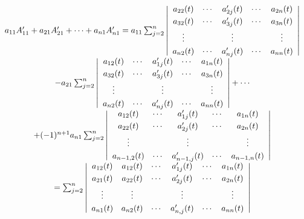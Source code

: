 \begin{frame}
  \begin{footnotesize}
    $$
    \begin{array}{c}
       a_{11}A_{11}^\prime +  a_{21}A_{21}^\prime + \cdots + a_{n1}A_{n1}^\prime
       =a_{11} \sum_{j=2}^n \left|
      \begin{array}{ccccc}
        a_{22}(t)&\cdots&a_{2j}^\prime(t)&\cdots&a_{2n}(t)\\[0.1cm]
        a_{32}(t)&\cdots&a_{3j}^\prime(t)&\cdots&a_{3n}(t)\\[0.1cm]
        \vdots&&\vdots&&\vdots\\[0.1cm]
        a_{n2}(t)&\cdots&a_{nj}^\prime(t)&\cdots&a_{nn}(t)
      \end{array}
      \right| \\[0.3in]
      -  a_{21}\sum_{j=2}^n \left|
      \begin{array}{ccccc}
        a_{12}(t)&\cdots&a_{1j}^\prime(t)&\cdots&a_{1n}(t)\\[0.1cm]
        a_{32}(t)&\cdots&a_{3j}^\prime(t)&\cdots&a_{3n}(t)\\[0.1cm]
        \vdots&&\vdots&&\vdots\\[0.1cm]
        a_{n2}(t)&\cdots&a_{nj}^\prime(t)&\cdots&a_{nn}(t)
      \end{array}
      \right| + \cdots \\[0.3in]
      + (-1)^{n+1}a_{n1}\sum_{j=2}^n \left|
      \begin{array}{ccccc}
        a_{12}(t)&\cdots&a_{1j}^\prime(t)&\cdots&a_{1n}(t)\\[0.1cm]
        a_{22}(t)&\cdots&a_{2j}^\prime(t)&\cdots&a_{2n}(t)\\[0.1cm]
        \vdots&&\vdots&&\vdots\\[0.1cm]
        a_{n-1,2}(t)&\cdots&a_{n-1,j}^\prime(t)&\cdots&a_{n-1,n}(t)
      \end{array}
      \right| \\[0.3in]
      = \sum_{j=2}^n \left|
      \begin{array}{cccccc}
        a_{12}(t)& a_{12}(t)&\cdots&a_{1j}^\prime(t)&\cdots&a_{1n}(t)\\[0.1cm]
        a_{21}(t)& a_{22}(t)&\cdots&a_{2j}^\prime(t)&\cdots&a_{2n}(t)\\[0.1cm]
        \vdots&\vdots&&\vdots&&\vdots\\[0.1cm]
        a_{n1}(t)& a_{n2}(t)&\cdots&a_{n,j}^\prime(t)&\cdots&a_{nn}(t)
      \end{array}
      \right|
    \end{array}
    $$
  \end{footnotesize}
\end{frame}


